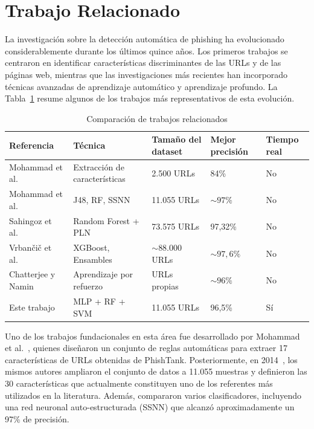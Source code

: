 \documentclass[conference]{IEEEtran}
\begin{document}
\section{Trabajo Relacionado}

La investigación sobre la detección automática de phishing ha evolucionado considerablemente durante los últimos quince años. Los primeros trabajos se centraron en identificar características discriminantes de las URLs y de las páginas web, mientras que las investigaciones más recientes han incorporado técnicas avanzadas de aprendizaje automático y aprendizaje profundo. La Tabla~\ref{tab:related} resume algunos de los trabajos más representativos de esta evolución.

\begin{table}[t]
\centering
\caption{Comparación de trabajos relacionados}
\label{tab:related}
\begin{tabular}{lllll}
\hline
\textbf{Referencia} & \textbf{Técnica} & \textbf{Tamaño del dataset} & \textbf{Mejor precisión} & \textbf{Tiempo real} \\
\hline
Mohammad et al.~\cite{mohammad2012} & Extracción de características & 2.500 URLs & 84\% & No \\
Mohammad et al.~\cite{mohammad2014} & J48, RF, SSNN & 11.055 URLs & $\sim97\%$ & No \\
Sahingoz et al.~\cite{sahingoz2019} & Random Forest + PLN & 73.575 URLs & 97,32\% & No \\
Vrban{\v{c}}i{\v{c}} et al.~\cite{vrbancic2020} & XGBoost, Ensambles & $\sim$88.000 URLs & $\sim97,6\%$ & No \\
Chatterjee y Namin~\cite{chatterjee2019} & Aprendizaje por refuerzo & URLs propias & $\sim96\%$ & No \\
Este trabajo & MLP + RF + SVM & 11.055 URLs & 96,5\% & Sí \\
\hline
\end{tabular}
\end{table}

Uno de los trabajos fundacionales en esta área fue desarrollado por Mohammad et al.~\cite{mohammad2012}, quienes diseñaron un conjunto de reglas automáticas para extraer 17 características de URLs obtenidas de PhishTank. Posteriormente, en 2014~\cite{mohammad2014}, los mismos autores ampliaron el conjunto de datos a 11.055 muestras y definieron las 30 características que actualmente constituyen uno de los referentes más utilizados en la literatura. Además, compararon varios clasificadores, incluyendo una red neuronal auto-estructurada (SSNN) que alcanzó aproximadamente un 97\% de precisión.
\end{document}
